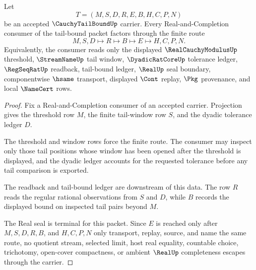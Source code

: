 \begin{theorem}
\label{thm:cauchy-tail-bound-finite-route}
Let
$$
T=(M,S,D,R,E,B,H,C,P,N)
$$
be an accepted $\CauchyTailBoundUp$ carrier. Every Real-and-Completion consumer of the tail-bound packet factors through the finite route
$$
M,S,D\longmapsto R\longmapsto B\longmapsto E\longmapsto H,C,P,N .
$$
Equivalently, the consumer reads only the displayed $\RealCauchyModulusUp$ threshold, $\StreamNameUp$ tail window, $\DyadicRatCoreUp$ tolerance ledger, $\RegSeqRatUp$ readback, tail-bound ledger, $\RealUp$ seal boundary, componentwise $\hsame$ transport, displayed $\Cont$ replay, $\Pkg$ provenance, and local $\NameCert$ rows.
\end{theorem}
\begin{proof}
Fix a Real-and-Completion consumer of an accepted carrier. Projection gives the threshold row $M$, the finite tail-window row $S$, and the dyadic tolerance ledger $D$.

The threshold and window rows force the finite route. The consumer may inspect only those tail positions whose window has been opened after the threshold is displayed, and the dyadic ledger accounts for the requested tolerance before any tail comparison is exported.

The readback and tail-bound ledger are downstream of this data. The row $R$ reads the regular rational observations from $S$ and $D$, while $B$ records the displayed bound on inspected tail pairs beyond $M$.

The Real seal is terminal for this packet. Since $E$ is reached only after $M,S,D,R,B$, and $H,C,P,N$ only transport, replay, source, and name the same route, no quotient stream, selected limit, host real equality, countable choice, trichotomy, open-cover compactness, or ambient $\RealUp$ completeness escapes through the carrier.
\end{proof}


